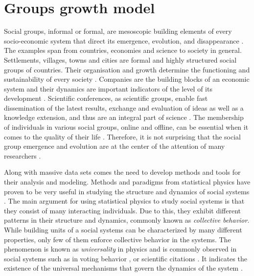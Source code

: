 
\chapter{Groups growth model} %


Social groups, informal or formal, are mesoscopic building elements of every socio-economic system that direct its emergence, evolution, and disappearance \cite{}. The examples span from countries, economies and science to society in general. Settlements, villages, towns and cities are formal and highly structured social groups of countries. Their organisation and growth determine the functioning and sustainability of every society \cite{barthelemy2016structure}. Companies are the building blocks of an economic system and their dynamics are important indicators of the level of its development \cite{hidalgo2009building}. Scientific conferences, as scientific groups, enable fast dissemination of the latest results, exchange and evaluation of ideas as well as a knowledge extension, and thus are an integral part of science \cite{smiljanic2016theoretical}. The membership of individuals in various social groups, online and offline, can be essential when it comes to the quality of their life \cite{montazeri2001anxiety, davison2000talks, cho2012tea}. Therefore, it is not surprising that the social group emergence and evolution are at the center of the attention of many researchers \cite{aral2012identifying,gonzalez2013broadcasters, torok2013opinions, yasseri2012dynamics}.

Along with massive data sets comes the need to develop methods and tools for their analysis and modeling. Methods and paradigms from statistical physics have proven to be very useful in studying the structure and dynamics of social systems \cite{castellano2009statistical}. The main argument for using statistical physics to study social systems is that they consist of many interacting individuals. Due to this, they exhibit different patterns in their structure and dynamics, commonly known as \textit{collective behavior}. While building units of a social systems can be characterized by many different properties, only few of them enforce collective behavior in the systems. The phenomenon is known as \textit{universality} in physics and is commonly observed in social systems such as in voting behavior \cite{chatterjee2013universality}, or scientific citations \cite{radicchi2008universality}. It indicates the existence of the universal mechanisms that govern the dynamics of the system \cite{}.



